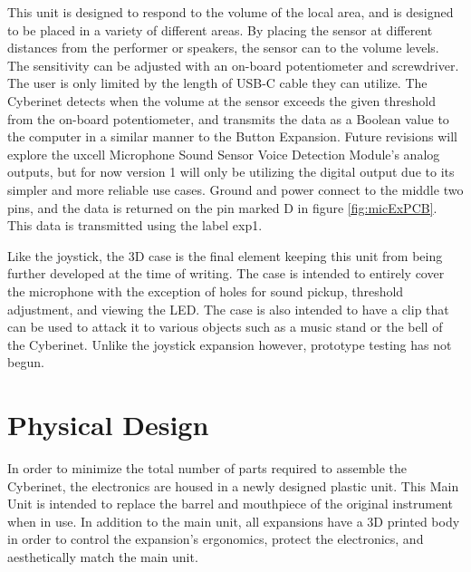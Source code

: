 This unit is designed to respond to the volume of the local area, and is designed to be placed in a variety of different areas. By placing the sensor at different distances from the performer or speakers, the sensor can to the volume levels. The sensitivity can be adjusted with an on-board potentiometer and screwdriver. The user is only limited by the length of USB-C cable they can utilize. The Cyberinet detects when the volume at the sensor exceeds the given threshold from the on-board potentiometer, and transmits the data as a Boolean value to the computer in a similar manner to the Button Expansion. Future revisions will explore the uxcell Microphone Sound Sensor Voice Detection Module's analog outputs, but for now version 1 will only be utilizing the digital output due to its simpler and more reliable use cases. Ground and power connect to the middle two pins, and the data is returned on the pin marked D in figure \ref{fig:micExPCB}. This data is transmitted using the label exp1. 

Like the joystick, the 3D case is the final element keeping this unit from being further developed at the time of writing. The case is intended to entirely cover the microphone with the exception of holes for sound pickup, threshold adjustment, and viewing the LED. The case is also intended to have a clip that can be used to attack it to various objects such as a music stand or the bell of the Cyberinet. Unlike the joystick expansion however, prototype testing has not begun.

\section{Physical Design}
In order to minimize the total number of parts required to assemble the Cyberinet, the electronics are housed in a newly designed plastic unit. This Main Unit is intended to replace the barrel and mouthpiece of the original instrument when in use. In addition to the main unit, all expansions have a 3D printed body in order to control the expansion's ergonomics, protect the electronics, and aesthetically match the main unit.

